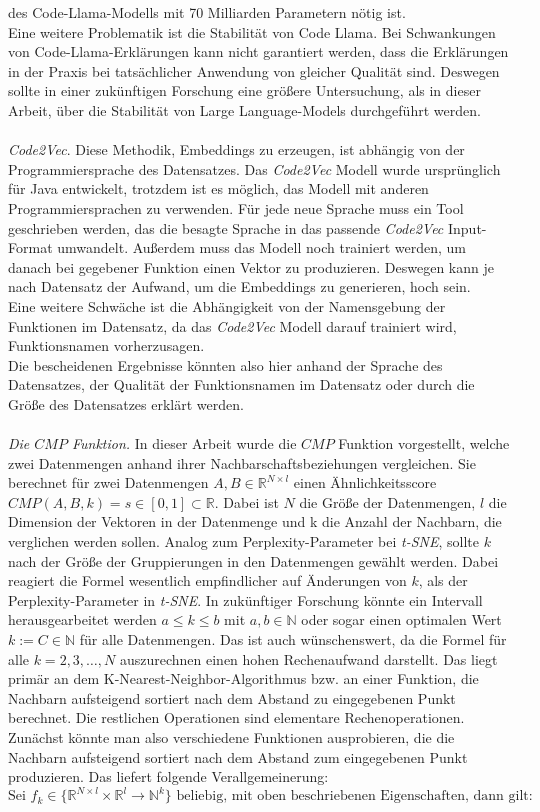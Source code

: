 \documentclass[12pt,letterpaper,ngerman]{article}
\begin{document}
des Code-Llama-Modells mit 70 Milliarden Parametern nötig ist. \\
Eine weitere Problematik ist die Stabilität von Code Llama.
Bei Schwankungen von Code-Llama-Erklärungen kann nicht garantiert 
werden, dass die Erklärungen in der Praxis bei tatsächlicher 
Anwendung von gleicher Qualität sind. Deswegen sollte in
einer zukünftigen Forschung eine größere Untersuchung, 
als in dieser Arbeit, über die Stabilität von Large 
Language-Models durchgeführt werden.\\\\
\textit{Code2Vec}. 
Diese Methodik, Embeddings zu erzeugen,
ist abhängig von der Programmiersprache des Datensatzes.  
Das \textit{Code2Vec} Modell wurde ursprünglich für Java entwickelt,
trotzdem ist es möglich, das Modell mit anderen Programmiersprachen
zu verwenden. Für jede neue Sprache muss ein Tool geschrieben werden,
das die besagte Sprache in das passende \textit{Code2Vec} 
Input-Format umwandelt. Außerdem muss das Modell noch trainiert 
werden, um danach bei gegebener Funktion einen Vektor zu 
produzieren. Deswegen kann je nach Datensatz der Aufwand,
um die Embeddings zu generieren, hoch sein. \\
Eine weitere Schwäche ist die Abhängigkeit von der Namensgebung 
der Funktionen im Datensatz, da das \textit{Code2Vec} Modell 
darauf trainiert wird, Funktionsnamen vorherzusagen.\\
Die bescheidenen Ergebnisse könnten also hier anhand der 
Sprache des Datensatzes, der Qualität der Funktionsnamen im 
Datensatz oder durch die Größe des Datensatzes erklärt werden.\\\\
\textit{Die $CMP$ Funktion.} 
In dieser Arbeit wurde die $CMP$ Funktion vorgestellt, welche 
zwei Datenmengen anhand ihrer Nachbarschaftsbeziehungen vergleichen.
Sie berechnet für zwei Datenmengen $A,B \in \mathbb{R}^{N\times l}$
einen Ähnlichkeitsscore $CMP(A,B,k) = s \in [0,1]\subset \mathbb{R}$.
Dabei ist $N$ die Größe der Datenmengen, $l$ die Dimension der 
Vektoren in der Datenmenge und k die Anzahl der Nachbarn, 
die verglichen werden sollen. Analog zum Perplexity-Parameter
bei \textit{t-SNE}, sollte $k$ nach der Größe der Gruppierungen 
in den Datenmengen gewählt werden. Dabei reagiert die Formel 
wesentlich empfindlicher auf Änderungen von $k$, als der 
Perplexity-Parameter in \textit{t-SNE}. In zukünftiger Forschung 
könnte ein Intervall herausgearbeitet werden $a \le k \le b $ mit
$ a,b \in \mathbb{N}$ oder sogar einen  optimalen Wert 
$k := C\in \mathbb{N}$ für alle Datenmengen.
Das ist auch wünschenswert, da die Formel für 
alle $k = 2,3,\dots, N$ auszurechnen einen hohen Rechenaufwand 
darstellt. Das liegt primär an dem K-Nearest-Neighbor-Algorithmus 
bzw. an einer Funktion, die Nachbarn aufsteigend sortiert nach 
dem Abstand zu eingegebenen Punkt berechnet. Die restlichen 
Operationen sind elementare Rechenoperationen. Zunächst könnte 
man also verschiedene Funktionen ausprobieren, die die Nachbarn 
aufsteigend sortiert nach dem Abstand zum eingegebenen Punkt 
produzieren. Das liefert folgende
Verallgemeinerung:
\[
  \text{Sei  }f_k \in \{\mathbb{R}^{N\times l}
  \times \mathbb{R}^l \to \mathbb{N}^k\} 
  \text{ beliebig, mit oben beschriebenen Eigenschaften, dann gilt:}
\]
\end{document}
